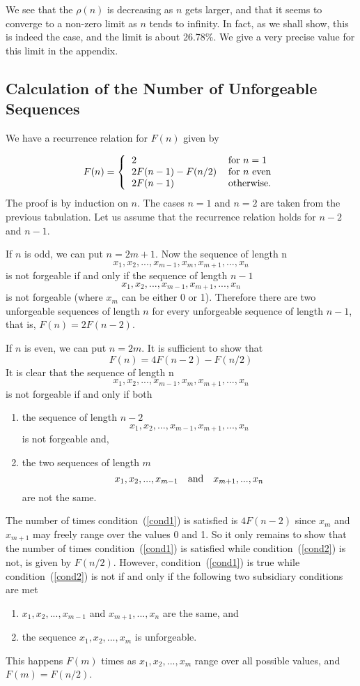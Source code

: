 \documentclass[12pt]{article}
\begin{document}
\bigskip\noindent
We see that the $\rho(n)$ is decreasing as 
$n$ gets larger, and that it seems to converge to a 
non-zero limit
as $n$ tends to infinity.  In fact, as we shall show, this
is indeed the case, and the limit is about
26.78\%.  We give a very precise value for this limit
in the appendix.

\subsection*{Calculation of the Number of Unforgeable Sequences}

We have a recurrence relation for $F(n)$ given by

\[
F(n) = \left\{
\begin{tabular}{ll}
  $2$ & for $n=1$ \\
  $2 F(n-1) - F(n/2)$ & for $n$ even \\
  $2 F(n-1)$ & otherwise. \\
\end{tabular}
\right.
\]
The proof is by induction on $n$.  The cases $n=1$ and $n=2$ are taken from
the previous tabulation.  Let us assume that the recurrence relation
holds for $n-2$ and $n-1$.

If $n$ is odd, we can put $n = 2m + 1$.  Now the sequence of length n
\[
  x_1, x_2, ..., x_{m-1}, x_m, x_{m+1}, ..., x_n
\]
is not forgeable if and only if the sequence of length $n-1$
\[
  x_1, x_2, ..., x_{m-1}, x_{m+1}, ..., x_n
\]
is not forgeable (where $x_m$ can be either 0 or 1).  Therefore there
are two unforgeable sequences of length $n$ for every unforgeable
sequence of length $n-1$, that is, $F(n) = 2 F(n-2)$.

If $n$ is even, we can put $n = 2 m$.  It is sufficient to show that
\[
 F(n) = 4 F(n-2) - F(n/2)
\]
It is clear that the sequence of length n
\[
  x_1, x_2, ..., x_{m-1}, x_m, x_{m+1}, ..., x_n
\]
is not forgeable if and only if both
\begin{enumerate}
\item \label{cond1}
the sequence of length $n-2$
\[
  x_1, x_2, ..., x_{m-1}, x_{m+1}, ..., x_n
\]
is not forgeable and,
\item \label{cond2}
the two sequences of length $m$
\[
  x_1, x_2, ..., x_{m-1}  \hbox{\rm\quad and\quad} x_{m+1}, ..., x_n
\]
are not the same.
\end{enumerate}
The number of times condition~(\ref{cond1}) is satisfied is $4 F(n-2)$ since
$x_m$ and $x_{m+1}$ may freely range over the values 0 and 1.  So it only
remains to show that the number of times condition~(\ref{cond1}) is satisfied
while condition~(\ref{cond2}) is not, is given by $F(n/2)$.  However, 
condition~(\ref{cond1}) is true
while condition~(\ref{cond2}) is not if and only if the following two 
subsidiary conditions are met
\begin{enumerate}
\item
$x_1, x_2, ..., x_{m-1}$ and $x_{m+1}, ..., x_n$
are the same, and
\item
the sequence $x_1, x_2, ..., x_{m} $ is unforgeable.
\end{enumerate}
This happens $F(m)$ times as $  x_1, x_2, ..., x_{m}$ range over all possible
values, and $F(m) = F(n/2)$.
\end{document}
